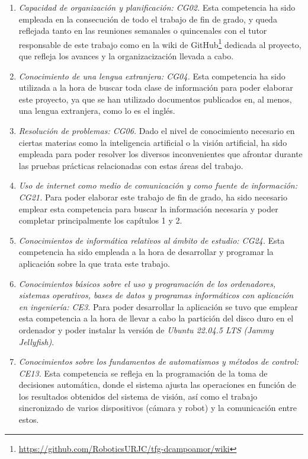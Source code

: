 \begin{enumerate} 
  \item \textit{Capacidad de organización y planificación: CG02.} Esta competencia ha sido empleada en la consecución de todo el trabajo de fin de grado, y queda reflejada tanto en las reuniones semanales o quincenales con el tutor responsable de este trabajo como en la wiki de GitHub\footnote{\url{https://github.com/RoboticsURJC/tfg-dcampoamor/wiki}} dedicada al proyecto, que refleja los avances y la organizacización llevada a cabo.  
  \item \textit{Conocimiento de una lengua extranjera: CG04.} Esta competencia ha sido utilizada a la hora de buscar toda clase de información para poder elaborar este proyecto, ya que se han utilizado documentos publicados en, al menos, una lengua extranjera, como lo es el inglés.
  \item \textit{Resolución de problemas: CG06.} Dado el nivel de conocimiento necesario en ciertas materias como la inteligencia artificial o la visión artificial, ha sido empleada para poder resolver los diversos inconvenientes que afrontar durante las pruebas prácticas relacionadas con estas áreas del trabajo.
  \item \textit{Uso de internet como medio de comunicación y como fuente de información: CG21.} Para poder elaborar este trabajo de fin de grado, ha sido necesario emplear esta competencia para buscar la información necesaria y poder completar principalmente los capítulos 1 y 2.
  \item \textit{Conocimientos de informática relativos al ámbito de estudio: CG24.} Esta competencia ha sido empleada a la hora de desarrollar y programar la aplicación sobre la que trata este trabajo.
  \item \textit{Conocimientos básicos sobre el uso y programación de los ordenadores, sistemas operativos, bases de datos y programas informáticos con aplicación en ingeniería: CE3.} Para poder desarrollar la aplicación se tuvo que emplear esta competencia a la hora de llevar a cabo la partición del disco duro en el ordenador y poder instalar la versión de \textit{Ubuntu 22.04.5 LTS (Jammy Jellyfish)}.  
  \item \textit{Conocimientos sobre los fundamentos de automatismos y métodos de control: CE13.} Esta competencia se refleja en la programación de la toma de decisiones automática, donde el sistema ajusta las operaciones en función de los resultados obtenidos del sistema de visión, así como el trabajo sincronizado de varios dispositivos (cámara y robot) y la comunicación entre estos.

\end{enumerate}
